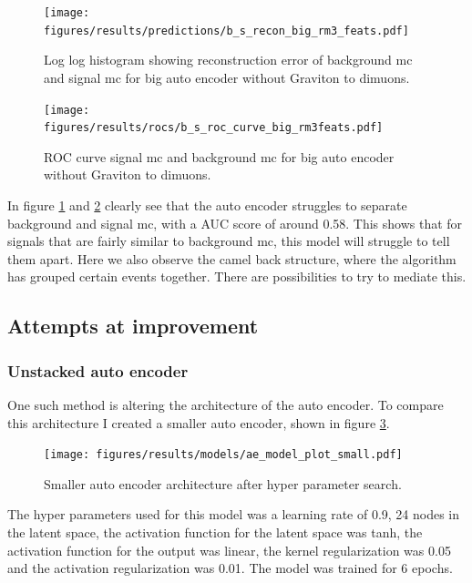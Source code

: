 \documentclass[ reprint, amsmath,amssymb, aps, nofootinbib]{revtex4-2}
\begin{document}
\begin{figure}[H]    
     \centering
    \texttt{[image: figures/results/predictions/b\_s\_recon\_big\_rm3\_feats.pdf]}
    \caption{Log log histogram showing reconstruction error of background mc and signal mc for big auto encoder without Graviton to dimuons.  }
    \label{fig:s_b_big_allsig_nogmumu}
\end{figure}

\begin{figure}[H]    
  \centering
         \texttt{[image: figures/results/rocs/b\_s\_roc\_curve\_big\_rm3feats.pdf]}
         \caption{ROC curve signal mc and background mc for big auto encoder without Graviton to dimuons. }
         \label{fig:roc_sig_big_allsig_nogmumu}
\end{figure}


In figure \ref{fig:s_b_big_allsig_nogmumu} and \ref{fig:roc_sig_big_allsig_nogmumu} clearly see that the auto encoder struggles to separate background and signal mc, with a AUC score of around 0.58. This shows that for signals that are fairly similar to background mc, this model will struggle to tell them apart. Here we also observe the camel back structure, where the algorithm has grouped certain events together. There are possibilities to try to mediate this. 

\subsection{Attempts at improvement}

\subsubsection{Unstacked auto encoder}
One such method is altering the architecture of the auto encoder. To compare this architecture I created a smaller auto encoder, shown in figure \ref{fig:small_ae_plot}.

\begin{figure}[H]
    \centering
    \texttt{[image: figures/results/models/ae\_model\_plot\_small.pdf]}
    \caption{Smaller auto encoder architecture after hyper parameter search. }
    \label{fig:small_ae_plot}
\end{figure}

The hyper parameters used for this model was a learning rate of 0.9, 24 nodes in the latent space, the activation function for the latent space was tanh, the activation function for the output was linear, the kernel regularization was 0.05 and the activation regularization was 0.01. The model was trained for 6 epochs. 
\end{document}
